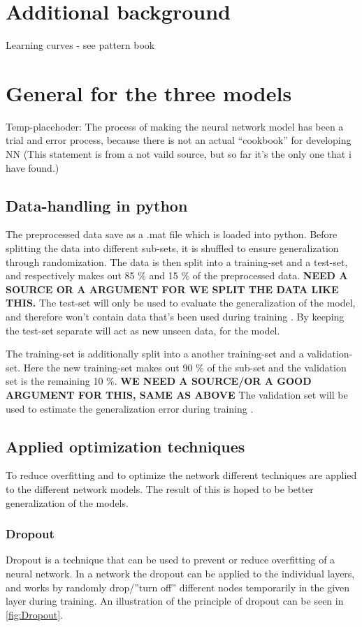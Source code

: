 \section{Additional background}
Learning curves - see pattern book


\section{General for the three models}




Temp-placehoder:
The process of making the neural network model has been a trial and error process, because there is not an actual “cookbook” for developing NN (This statement is from a not vaild source, but so far it’s the only one that i have found.)  

\subsection{Data-handling in python}
The preprocessed data save as a .mat file which is loaded into python. Before splitting the data into different sub-sets, it is shuffled to ensure generalization through randomization. The data is then split into a training-set and a test-set, and respectively makes out 85 \% and 15 \% of the preprocessed data. \textbf{NEED A SOURCE OR A ARGUMENT FOR WE SPLIT THE DATA LIKE THIS.} The test-set will only be used to evaluate the generalization of the model, and therefore won't contain data that's been used during training \citep{Duda2000}. 
By keeping the test-set separate will act as new unseen data, for the model.  

The training-set is additionally split into a another training-set and a validation-set. Here the new training-set makes out 90 \% of the sub-set and the validation set is the remaining 10 \%. \textbf{WE NEED A SOURCE/OR A GOOD ARGUMENT FOR THIS, SAME AS ABOVE} 
The validation set will be used to estimate the generalization error during training \citep{Duda2000}.  

\subsection{Applied optimization techniques}
To reduce overfitting and to optimize the network different techniques are applied to the different network models. The result of this is hoped to be better generalization of the models. 

\subsubsection{Dropout}
Dropout is a technique that can be used to prevent or reduce overfitting of a neural network. In a network the dropout can be applied to the individual layers, and works by randomly drop/”turn off” different nodes temporarily in the given layer during training. An illustration of the principle of dropout can be seen in \autoref{fig:Dropout}.  

